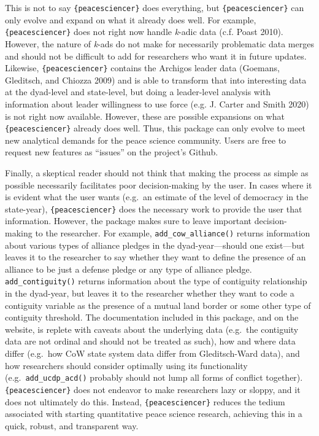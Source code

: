 \documentclass[
  11pt,
]{article}
\begin{document}
This is not to say \texttt{\{peacesciencer\}} does everything, but \texttt{\{peacesciencer\}} can only evolve and expand on what it already does well. For example, \texttt{\{peacesciencer\}} does not right now handle \emph{k}-adic data (c.f. Poast 2010). However, the nature of \emph{k}-ads do not make for necessarily problematic data merges and should not be difficult to add for researchers who want it in future updates. Likewise, \texttt{\{peacesciencer\}} contains the Archigos leader data (Goemans, Gleditsch, and Chiozza 2009) and is able to transform that into interesting data at the dyad-level and state-level, but doing a leader-level analysis with information about leader willingness to use force (e.g. J. Carter and Smith 2020) is not right now available. However, these are possible expansions on what \texttt{\{peacesciencer\}} already does well. Thus, this package can only evolve to meet new analytical demands for the peace science community. Users are free to request new features as ``issues'' on the project's Github.

Finally, a skeptical reader should not think that making the process as simple as possible necessarily facilitates poor decision-making by the user. In cases where it is evident what the user wants (e.g.~an estimate of the level of democracy in the state-year), \texttt{\{peacesciencer\}} does the necessary work to provide the user that information. However, the package makes sure to leave important decision-making to the researcher. For example, \texttt{add\_cow\_alliance()} returns information about various types of alliance pledges in the dyad-year---should one exist---but leaves it to the researcher to say whether they want to define the presence of an alliance to be just a defense pledge or any type of alliance pledge. \texttt{add\_contiguity()} returns information about the type of contiguity relationship in the dyad-year, but leaves it to the researcher whether they want to code a contiguity variable as the presence of a mutual land border or some other type of contiguity threshold. The documentation included in this package, and on the website, is replete with caveats about the underlying data (e.g.~the contiguity data are not ordinal and should not be treated as such), how and where data differ (e.g.~how CoW state system data differ from Gleditsch-Ward data), and how researchers should consider optimally using its functionality (e.g.~\texttt{add\_ucdp\_acd()} probably should not lump all forms of conflict together). \texttt{\{peacesciencer\}} does not endeavor to make researchers lazy or sloppy, and it does not ultimately do this. Instead, \texttt{\{peacesciencer\}} reduces the tedium associated with starting quantitative peace science research, achieving this in a quick, robust, and transparent way.
\end{document}
